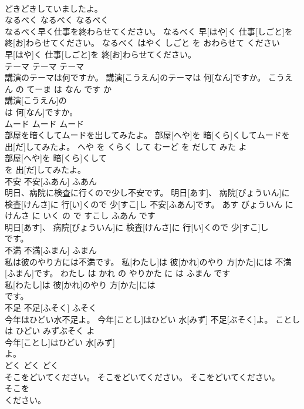 \documentclass[8pt]{extreport}
\begin{document}
\begin{CJK}{UTF8}{min}
\\	どきどきしていましたよ。			
\\	なるべく	なるべく	なるべく	
\\	なるべく早く仕事を終わらせてください。	なるべく 早[はや]く 仕事[しごと]を 終[お]わらせてください。	なるべく はやく しごと を おわらせて ください	
\\	早[はや]く 仕事[しごと]を 終[お]わらせてください。			
\\	テーマ	テーマ	テーマ	
\\	講演のテーマは何ですか。	講演[こうえん]のテーマは 何[なん]ですか。	こうえん の てーま は なん です か	
\\	講演[こうえん]の
\\	は 何[なん]ですか。			
\\	ムード	ムード	ムード	
\\	部屋を暗くしてムードを出してみたよ。	部屋[へや]を 暗[くら]くしてムードを 出[だ]してみたよ。	へや を くらく して むーど を だして みた よ	
\\	部屋[へや]を 暗[くら]くして
\\	を 出[だ]してみたよ。			
\\	不安	不安[ふあん]	ふあん	
\\	明日、病院に検査に行くので少し不安です。	明日[あす]、 病院[びょういん]に 検査[けんさ]に 行[い]くので 少[すこ]し 不安[ふあん]です。	あす びょういん に けんさ に いく の で すこし ふあん です	
\\	明日[あす]、 病院[びょういん]に 検査[けんさ]に 行[い]くので 少[すこ]し
\\	です。			
\\	不満	不満[ふまん]	ふまん	
\\	私は彼のやり方には不満です。	私[わたし]は 彼[かれ]のやり 方[かた]には 不満[ふまん]です。	わたし は かれ の やりかた に は ふまん です	
\\	私[わたし]は 彼[かれ]のやり 方[かた]には
\\	です。			
\\	不足	不足[ふそく]	ふそく	
\\	今年はひどい水不足よ。	今年[ことし]はひどい 水[みず] 不足[ぶそく]よ。	ことし は ひどい みずぶそく よ	
\\	今年[ことし]はひどい 水[みず]
\\	よ。			
\\	どく	どく	どく	
\\	そこをどいてください。	そこをどいてください。	そこをどいてください。	
\\	そこを
\\	ください。			

\end{CJK}
\end{document}
